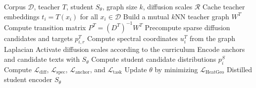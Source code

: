 \begin{algorithm}[t]
\caption{HeatGeo Training}
\label{alg:heatgeo}
\begin{algorithmic}[1]
\REQUIRE Corpus $\mathcal{D}$, teacher $T$, student $S_{\theta}$, graph size $k$, diffusion scales $\mathcal{R}$
\STATE Cache teacher embeddings $t_i=T(x_i)$ for all $x_i\in\mathcal{D}$
\STATE Build a mutual $k$NN teacher graph $W^T$
\STATE Compute transition matrix $P^T=(D^T)^{-1}W^T$
\STATE Precompute sparse diffusion candidates and targets $p_{i,r}^T$
\STATE Compute spectral coordinates $u_i^T$ from the graph Laplacian
    \STATE Activate diffusion scales according to the curriculum
        \STATE Encode anchors and candidate texts with $S_{\theta}$
        \STATE Compute student candidate distributions $p_i^S$
        \STATE Compute $\mathcal{L}_{\mathrm{diff}}$, $\mathcal{L}_{\mathrm{spec}}$, $\mathcal{L}_{\mathrm{anchor}}$, and $\mathcal{L}_{\mathrm{task}}$
        \STATE Update $\theta$ by minimizing $\mathcal{L}_{\mathrm{HeatGeo}}$
    \ENDFOR
\ENDFOR
\RETURN Distilled student encoder $S_{\theta}$
\end{algorithmic}
\end{algorithm}
